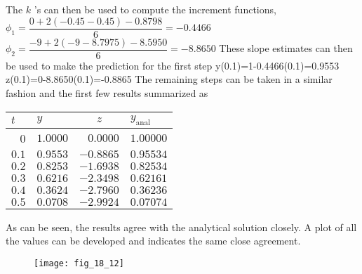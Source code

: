 \documentclass[../main.tex]{subfiles}
\begin{document}
\begin{enumerate}[label=\bfseries(\alph*)]
	\bigbreak
The $k$ 's can then be used to compute the increment functions,
	\bigbreak
$\phi_{1}=\dfrac{0+2(-0.45-0.45)-0.8798}{6}=-0.4466$
	\bigbreak
$\phi_{2}=\dfrac{-9+2(-9-8.7975)-8.5950}{6}=-8.8650$
	\bigbreak
These slope estimates can then be used to make the prediction for the first step
	\bigbreak
y(0.1)=1-0.4466(0.1)=0.9553
	\bigbreak
z(0.1)=0-8.8650(0.1)=-0.8865
	\bigbreak
The remaining steps can be taken in a similar fashion and the first few results summarized as
	\bigbreak
\begin{tabular}{rlrl}
\hline
\multicolumn{1}{l}{$t$} & $y$ & \multicolumn{1}{c}{$z$} & $y_{\text {anal }}$ \\
\hline
0 & $1.0000$ & $0.0000$ & $1.00000$ \\
$0.1$ & $0.9553$ & $-0.8865$ & $0.95534$ \\
$0.2$ & $0.8253$ & $-1.6938$ & $0.82534$ \\
$0.3$ & $0.6216$ & $-2.3498$ & $0.62161$ \\
$0.4$ & $0.3624$ & $-2.7960$ & $0.36236$ \\
$0.5$ & $0.0708$ & $-2.9924$ & $0.07074$ \\
\hline
\end{tabular}
	\bigbreak
As can be seen, the results agree with the analytical solution closely. A plot of all the values can be developed and indicates the same close agreement.
	\bigbreak
	\begin{figure}[H]
		\texttt{[image: fig\_18\_12]}
		\label{fig:fig_18_12}
	\end{figure}
	\bigbreak
\end{enumerate}
\end{document}
